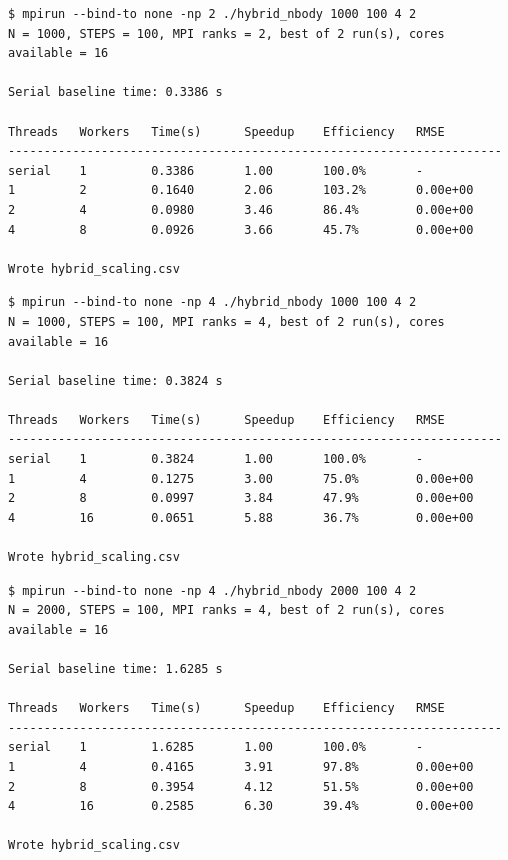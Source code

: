 \documentclass[11pt,a4paper]{article}
\begin{document}
\begin{lstlisting}[caption={Hybrid MPI+OpenMP, $N=1000$, 2 MPI ranks}]
$ mpirun --bind-to none -np 2 ./hybrid_nbody 1000 100 4 2
N = 1000, STEPS = 100, MPI ranks = 2, best of 2 run(s), cores available = 16

Serial baseline time: 0.3386 s

Threads   Workers   Time(s)      Speedup    Efficiency   RMSE
---------------------------------------------------------------------
serial    1         0.3386       1.00       100.0%       -
1         2         0.1640       2.06       103.2%       0.00e+00
2         4         0.0980       3.46       86.4%        0.00e+00
4         8         0.0926       3.66       45.7%        0.00e+00

Wrote hybrid_scaling.csv
\end{lstlisting}

\begin{lstlisting}[caption={Hybrid MPI+OpenMP, $N=1000$, 4 MPI ranks. Fastest $N=1000$ result: 0.0651\,s}]
$ mpirun --bind-to none -np 4 ./hybrid_nbody 1000 100 4 2
N = 1000, STEPS = 100, MPI ranks = 4, best of 2 run(s), cores available = 16

Serial baseline time: 0.3824 s

Threads   Workers   Time(s)      Speedup    Efficiency   RMSE
---------------------------------------------------------------------
serial    1         0.3824       1.00       100.0%       -
1         4         0.1275       3.00       75.0%        0.00e+00
2         8         0.0997       3.84       47.9%        0.00e+00
4         16        0.0651       5.88       36.7%        0.00e+00

Wrote hybrid_scaling.csv
\end{lstlisting}

\begin{lstlisting}[caption={Hybrid MPI+OpenMP, $N=2000$, 4 MPI ranks. Fastest $N=2000$ result: 0.2585\,s}]
$ mpirun --bind-to none -np 4 ./hybrid_nbody 2000 100 4 2
N = 2000, STEPS = 100, MPI ranks = 4, best of 2 run(s), cores available = 16

Serial baseline time: 1.6285 s

Threads   Workers   Time(s)      Speedup    Efficiency   RMSE
---------------------------------------------------------------------
serial    1         1.6285       1.00       100.0%       -
1         4         0.4165       3.91       97.8%        0.00e+00
2         8         0.3954       4.12       51.5%        0.00e+00
4         16        0.2585       6.30       39.4%        0.00e+00

Wrote hybrid_scaling.csv
\end{lstlisting}
\end{document}
